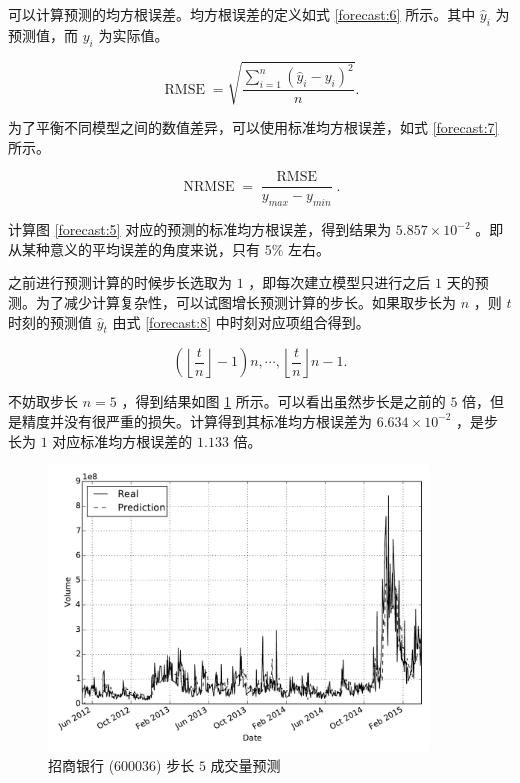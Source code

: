 可以计算预测的均方根误差。均方根误差的定义如式 \ref{forecast:6} 所示。其中 $\hat{y}_{i}$ 为预测值，而 $y_{i}$ 为实际值。

\begin{equation}
  \label{forecast:6}
  \operatorname{RMSE}=\sqrt{\frac{\sum_{i=1}^{n}(\hat{y}_{i}-y_{i})^{2}}{n}}.
\end{equation}

为了平衡不同模型之间的数值差异，可以使用标准均方根误差，如式 \ref{forecast:7} 所示。

\begin{equation}
  \label{forecast:7}
  \operatorname{NRMSE}=\frac{\operatorname{RMSE}}{y_{max}-y_{min}}.
\end{equation}

计算图 \ref{forecast:5} 对应的预测的标准均方根误差，得到结果为 $5.857\times 10^{-2}$ 。即从某种意义的平均误差的角度来说，只有 $5\%$ 左右。

之前进行预测计算的时候步长选取为 $1$ ，即每次建立模型只进行之后 $1$ 天的预测。为了减少计算复杂性，可以试图增长预测计算的步长。如果取步长为 $n$ ，则 $t$ 时刻的预测值 $\hat{y}_{t}$ 由式 \ref{forecast:8} 中时刻对应项组合得到。

\begin{equation}
  \label{forecast:8}
  \left (\left \lfloor \frac{t}{n}\right \rfloor -1\right )n,\cdots,\left \lfloor \frac{t}{n}\right \rfloor n-1.
\end{equation}

不妨取步长 $n=5$ ，得到结果如图 \ref{forecast:9} 所示。可以看出虽然步长是之前的 $5$ 倍，但是精度并没有很严重的损失。计算得到其标准均方根误差为 $6.634\times 10^{-2}$ ，是步长为 $1$ 对应标准均方根误差的 $1.133$ 倍。

\begin{figure}
  \centering
  \includegraphics[width=0.9\textwidth]{plots/var_forecast_regression_line_5_step.pdf}
  \caption{招商银行 (600036) 步长 $5$ 成交量预测}
  \label{forecast:9}
\end{figure}

